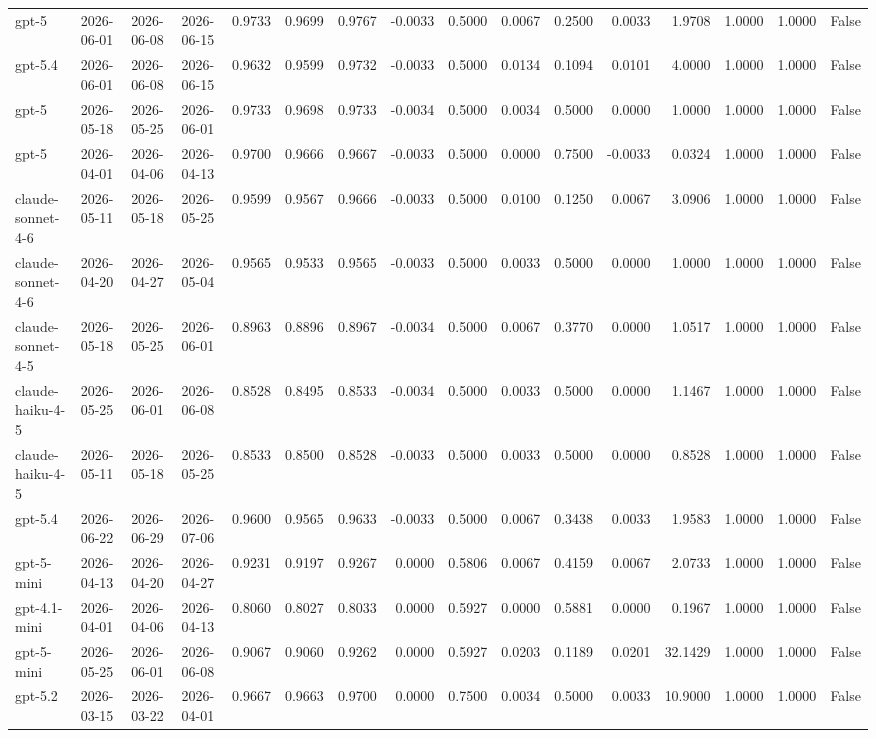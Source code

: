 \begin{table}
\begin{tabular}{llllrrrrrrrrrrrr}
gpt-5 & 2026-06-01 & 2026-06-08 & 2026-06-15 & 0.9733 & 0.9699 & 0.9767 & -0.0033 & 0.5000 & 0.0067 & 0.2500 & 0.0033 & 1.9708 & 1.0000 & 1.0000 & False \\
gpt-5.4 & 2026-06-01 & 2026-06-08 & 2026-06-15 & 0.9632 & 0.9599 & 0.9732 & -0.0033 & 0.5000 & 0.0134 & 0.1094 & 0.0101 & 4.0000 & 1.0000 & 1.0000 & False \\
gpt-5 & 2026-05-18 & 2026-05-25 & 2026-06-01 & 0.9733 & 0.9698 & 0.9733 & -0.0034 & 0.5000 & 0.0034 & 0.5000 & 0.0000 & 1.0000 & 1.0000 & 1.0000 & False \\
gpt-5 & 2026-04-01 & 2026-04-06 & 2026-04-13 & 0.9700 & 0.9666 & 0.9667 & -0.0033 & 0.5000 & 0.0000 & 0.7500 & -0.0033 & 0.0324 & 1.0000 & 1.0000 & False \\
claude-sonnet-4-6 & 2026-05-11 & 2026-05-18 & 2026-05-25 & 0.9599 & 0.9567 & 0.9666 & -0.0033 & 0.5000 & 0.0100 & 0.1250 & 0.0067 & 3.0906 & 1.0000 & 1.0000 & False \\
claude-sonnet-4-6 & 2026-04-20 & 2026-04-27 & 2026-05-04 & 0.9565 & 0.9533 & 0.9565 & -0.0033 & 0.5000 & 0.0033 & 0.5000 & 0.0000 & 1.0000 & 1.0000 & 1.0000 & False \\
claude-sonnet-4-5 & 2026-05-18 & 2026-05-25 & 2026-06-01 & 0.8963 & 0.8896 & 0.8967 & -0.0034 & 0.5000 & 0.0067 & 0.3770 & 0.0000 & 1.0517 & 1.0000 & 1.0000 & False \\
claude-haiku-4-5 & 2026-05-25 & 2026-06-01 & 2026-06-08 & 0.8528 & 0.8495 & 0.8533 & -0.0034 & 0.5000 & 0.0033 & 0.5000 & 0.0000 & 1.1467 & 1.0000 & 1.0000 & False \\
claude-haiku-4-5 & 2026-05-11 & 2026-05-18 & 2026-05-25 & 0.8533 & 0.8500 & 0.8528 & -0.0033 & 0.5000 & 0.0033 & 0.5000 & 0.0000 & 0.8528 & 1.0000 & 1.0000 & False \\
gpt-5.4 & 2026-06-22 & 2026-06-29 & 2026-07-06 & 0.9600 & 0.9565 & 0.9633 & -0.0033 & 0.5000 & 0.0067 & 0.3438 & 0.0033 & 1.9583 & 1.0000 & 1.0000 & False \\
gpt-5-mini & 2026-04-13 & 2026-04-20 & 2026-04-27 & 0.9231 & 0.9197 & 0.9267 & 0.0000 & 0.5806 & 0.0067 & 0.4159 & 0.0067 & 2.0733 & 1.0000 & 1.0000 & False \\
gpt-4.1-mini & 2026-04-01 & 2026-04-06 & 2026-04-13 & 0.8060 & 0.8027 & 0.8033 & 0.0000 & 0.5927 & 0.0000 & 0.5881 & 0.0000 & 0.1967 & 1.0000 & 1.0000 & False \\
gpt-5-mini & 2026-05-25 & 2026-06-01 & 2026-06-08 & 0.9067 & 0.9060 & 0.9262 & 0.0000 & 0.5927 & 0.0203 & 0.1189 & 0.0201 & 32.1429 & 1.0000 & 1.0000 & False \\
gpt-5.2 & 2026-03-15 & 2026-03-22 & 2026-04-01 & 0.9667 & 0.9663 & 0.9700 & 0.0000 & 0.7500 & 0.0034 & 0.5000 & 0.0033 & 10.9000 & 1.0000 & 1.0000 & False \\
\bottomrule
\end{tabular}
\end{table}
